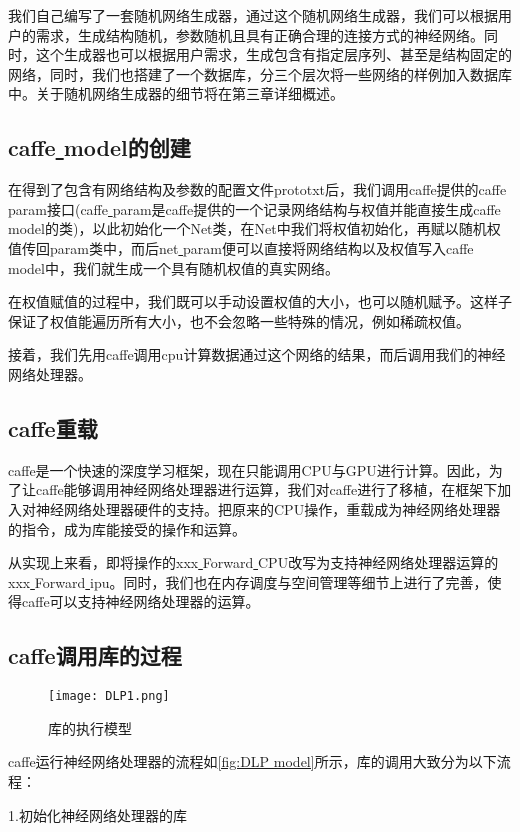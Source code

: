 我们自己编写了一套随机网络生成器，通过这个随机网络生成器，我们可以根据用户的需求，生成结构随机，参数随机且具有正确合理的连接方式的神经网络。同时，这个生成器也可以根据用户需求，生成包含有指定层序列、甚至是结构固定的网络，同时，我们也搭建了一个数据库，分三个层次将一些网络的样例加入数据库中。关于随机网络生成器的细节将在第三章详细概述。

\subsection{caffe\underline{ }model的创建}
在得到了包含有网络结构及参数的配置文件prototxt后，我们调用caffe提供的caffe\underline{ }param接口(caffe\underline{ }param是caffe提供的一个记录网络结构与权值并能直接生成caffe\underline{ }model的类)，以此初始化一个Net类，在Net中我们将权值初始化，再赋以随机权值传回param类中，而后net\underline{ }param便可以直接将网络结构以及权值写入caffe\underline{ }model中，我们就生成一个具有随机权值的真实网络。

在权值赋值的过程中，我们既可以手动设置权值的大小，也可以随机赋予。这样子保证了权值能遍历所有大小，也不会忽略一些特殊的情况，例如稀疏权值。

接着，我们先用caffe调用cpu计算数据通过这个网络的结果，而后调用我们的神经网络处理器。

\subsection{caffe重载}
caffe是一个快速的深度学习框架，现在只能调用CPU与GPU进行计算。因此，为了让caffe能够调用神经网络处理器进行运算，我们对caffe进行了移植，在框架下加入对神经网络处理器硬件的支持。把原来的CPU操作，重载成为神经网络处理器的指令，成为库能接受的操作和运算。

从实现上来看，即将操作的xxx\underline{ }Forward\underline{ }CPU改写为支持神经网络处理器运算的xxx\underline{ }Forward\underline{ }ipu。同时，我们也在内存调度与空间管理等细节上进行了完善，使得caffe可以支持神经网络处理器的运算。

\subsection{caffe调用库的过程}
\begin{figure}[!htbp]
\centering
\texttt{[image: DLP1.png]}
\caption{库的执行模型}
\label{fig:DLP model}
\end{figure}
caffe运行神经网络处理器的流程如\autoref{fig:DLP model}所示，库的调用大致分为以下流程：

1.初始化神经网络处理器的库

